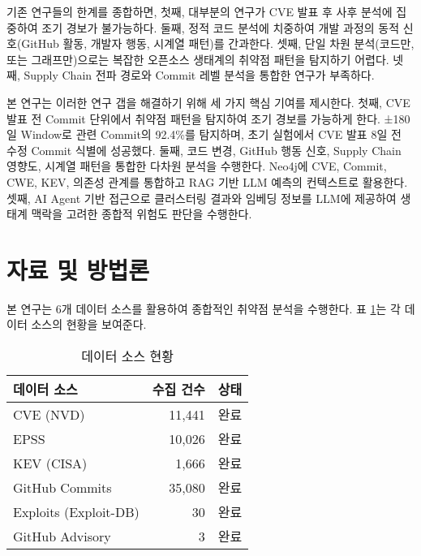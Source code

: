 ﻿\documentclass[conference]{IEEEtran}
\begin{document}
기존 연구들의 한계를 종합하면, 첫째, 대부분의 연구가 CVE 발표 후 사후 분석에 집중하여 조기 경보가 불가능하다. 둘째, 정적 코드 분석에 치중하여 개발 과정의 동적 신호(GitHub 활동, 개발자 행동, 시계열 패턴)를 간과한다. 셋째, 단일 차원 분석(코드만, 또는 그래프만)으로는 복잡한 오픈소스 생태계의 취약점 패턴을 탐지하기 어렵다. 넷째, Supply Chain 전파 경로와 Commit 레벨 분석을 통합한 연구가 부족하다.

본 연구는 이러한 연구 갭을 해결하기 위해 세 가지 핵심 기여를 제시한다. 첫째, CVE 발표 전 Commit 단위에서 취약점 패턴을 탐지하여 조기 경보를 가능하게 한다. ±180일 Window로 관련 Commit의 92.4\%를 탐지하며, 초기 실험에서 CVE 발표 8일 전 수정 Commit 식별에 성공했다. 둘째, 코드 변경, GitHub 행동 신호, Supply Chain 영향도, 시계열 패턴을 통합한 다차원 분석을 수행한다. Neo4j에 CVE, Commit, CWE, KEV, 의존성 관계를 통합하고 RAG 기반 LLM 예측의 컨텍스트로 활용한다. 셋째, AI Agent 기반 접근으로 클러스터링 결과와 임베딩 정보를 LLM에 제공하여 생태계 맥락을 고려한 종합적 위험도 판단을 수행한다.


\section{자료 및 방법론}

본 연구는 6개 데이터 소스를 활용하여 종합적인 취약점 분석을 수행한다. 표 \ref{tab:data_sources}는 각 데이터 소스의 현황을 보여준다.

\begin{table}[h]
\centering
\caption{데이터 소스 현황}
\label{tab:data_sources}
\begin{tabular}{lrr}
\toprule
\textbf{데이터 소스} & \textbf{수집 건수} & \textbf{상태} \\
\midrule
CVE (NVD) & 11,441 & 완료 \\
EPSS & 10,026 & 완료 \\
KEV (CISA) & 1,666 & 완료 \\
GitHub Commits & 35,080 & 완료 \\
Exploits (Exploit-DB) & 30 & 완료 \\
GitHub Advisory & 3 & 완료 \\
\bottomrule
\end{tabular}
\end{table}
\end{document}
